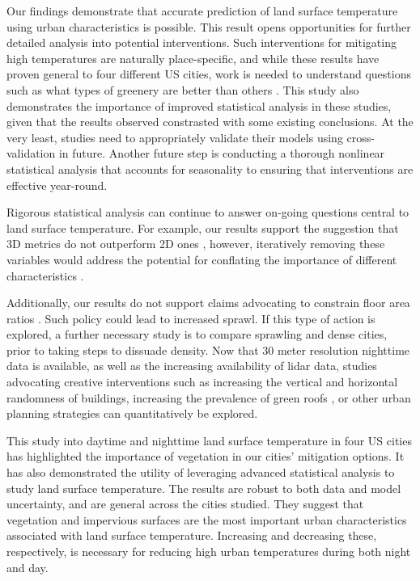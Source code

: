 \documentclass[final,3p,times,twocolumn,sort&compress]{elsarticle}
\begin{document}
Our findings demonstrate that accurate prediction of land surface temperature using urban characteristics is possible.
This result opens opportunities for further detailed analysis into potential interventions.
Such interventions for mitigating high temperatures are naturally place-specific, and while these results have proven general to four different US cities, work is needed to understand questions such as what types of greenery are better than others \cite{Gober2009-im}.
This study also demonstrates the importance of improved statistical analysis in these studies, given that the results observed constrasted with some existing conclusions.
At the very least, studies need to appropriately validate their models using cross-validation in future.
Another future step is conducting a thorough nonlinear statistical analysis that accounts for seasonality to ensuring that interventions are effective year-round.

Rigorous statistical analysis can continue to answer on-going questions central to land surface temperature.
For example, our results support the suggestion that 3D metrics do not outperform 2D ones \cite{Berger2017-lx}, however, iteratively removing these variables would address the potential for conflating the importance of different characteristics \cite{Chun2017-mm}.

Additionally, our results do not support claims advocating to constrain floor area ratios \cite{Chun2017-mm}.
Such policy could lead to increased sprawl.
If this type of action is explored, a further necessary study is to compare sprawling and dense cities, prior to taking steps to dissuade density. 
Now that 30 meter resolution nighttime data is available, as well as the increasing availability of lidar data, studies advocating creative interventions such as increasing the vertical and horizontal randomness of buildings, increasing the prevalence of green roofs \cite{Gago2013-ta}, or other urban planning strategies can quantitatively be explored.

This study into daytime and nighttime land surface temperature in four US cities has highlighted the importance of vegetation in our cities' mitigation options. 
It has also demonstrated the utility of leveraging advanced statistical analysis to study land surface temperature.
The results are robust to both data and model uncertainty, and are general across the cities studied.
They suggest that vegetation and impervious surfaces are the most important urban characteristics associated with land surface temperature.
Increasing and decreasing these, respectively, is necessary for reducing high urban temperatures during both night and day.
\end{document}
